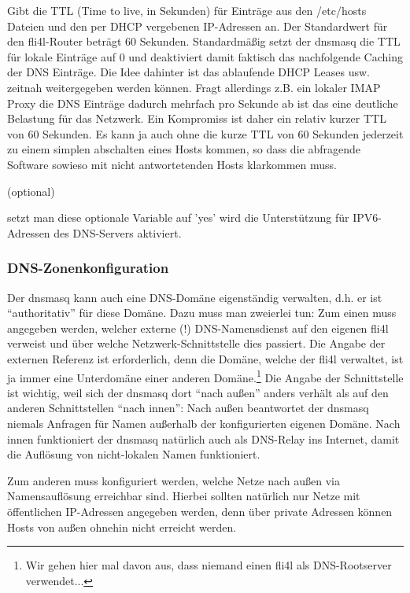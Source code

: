 \begin{description}
     {Gibt die TTL (Time to live, in Sekunden) für Einträge aus den
     /etc/hosts Dateien und den per DHCP vergebenen IP-Adressen
     an. Der Standardwert für den fli4l-Router beträgt 60
     Sekunden. Standardmäßig setzt der dnsmasq die TTL für lokale
     Einträge auf 0 und deaktiviert damit faktisch das nachfolgende
     Caching der DNS Einträge. Die Idee dahinter ist das ablaufende
     DHCP Leases usw. zeitnah weitergegeben werden können. Fragt
     allerdings z.B. ein lokaler IMAP Proxy die DNS Einträge dadurch
     mehrfach pro Sekunde ab ist das eine deutliche Belastung für das
     Netzwerk. Ein Kompromiss ist daher ein relativ kurzer TTL von 60
     Sekunden. Es kann ja auch ohne die kurze TTL von 60 Sekunden
     jederzeit zu einem simplen abschalten eines Hosts kommen, so dass
     die abfragende Software sowieso mit nicht antwortetenden Hosts
     klarkommen muss.}

      (optional)
     
     {setzt man diese optionale Variable auf 'yes' wird die Unterstützung für IPV6-
     Adressen des DNS-Servers aktiviert.}

  \end{description}

\subsubsection{DNS-Zonenkonfiguration}

Der dnsmasq kann auch eine DNS-Domäne eigenständig verwalten, d.h. er ist
``authoritativ'' für diese Domäne. Dazu muss man zweierlei tun: Zum einen muss
angegeben werden, welcher externe (!) DNS-Namensdienst auf den eigenen fli4l
verweist und über welche Netzwerk-Schnittstelle dies passiert. Die Angabe der
externen Referenz ist erforderlich, denn die Domäne, welche der fli4l verwaltet,
ist ja immer eine Unterdomäne einer anderen Domäne.\footnote{Wir gehen hier mal
davon aus, dass niemand einen fli4l als DNS-Rootserver verwendet...} Die Angabe
der Schnittstelle ist wichtig, weil sich der dnsmasq dort ``nach außen'' anders
verhält als auf den anderen Schnittstellen ``nach innen'': Nach außen
beantwortet der dnsmasq niemals Anfragen für Namen außerhalb der konfigurierten
eigenen Domäne. Nach innen funktioniert der dnsmasq natürlich auch als DNS-Relay
ins Internet, damit die Auflösung von nicht-lokalen Namen funktioniert.

Zum anderen muss konfiguriert werden, welche Netze nach außen via
Namensauflösung erreichbar sind. Hierbei sollten natürlich nur Netze mit
öffentlichen IP-Adressen angegeben werden, denn über private Adressen können
Hosts von außen ohnehin nicht erreicht werden.

